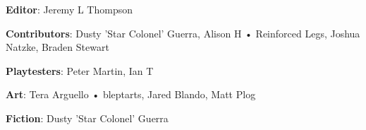 \begin{description}

\item {\bfseries Editor}: Jeremy L Thompson

\item {\bfseries Contributors}: Dusty 'Star Colonel' Guerra, Alison H • Reinforced Legs, Joshua Natzke, Braden Stewart

\item {\bfseries Playtesters}: Peter Martin, Ian T

\item {\bfseries Art}: Tera Arguello • bleptarts, Jared Blando, Matt Plog

\item {\bfseries Fiction}: Dusty 'Star Colonel' Guerra

\end{description}
